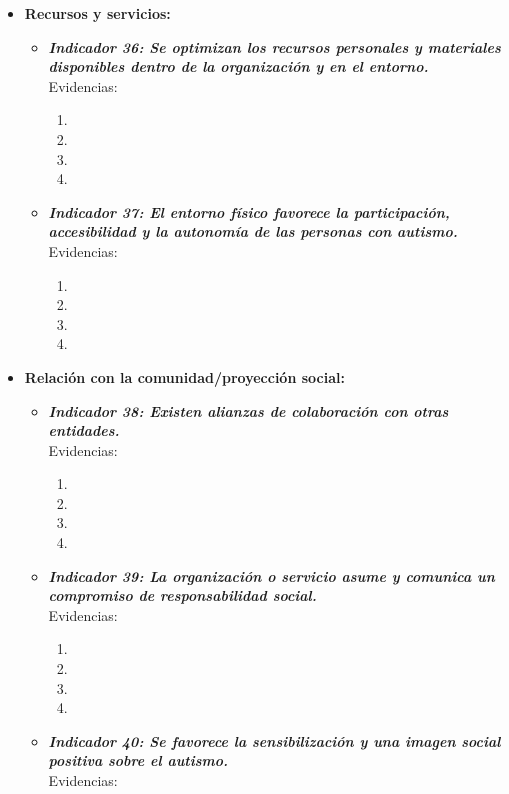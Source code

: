 \begin{itemize}
	\item \textbf{Recursos y servicios:}
	\begin{itemize}
		\item \textbf{\textit{Indicador 36:  Se optimizan los recursos personales y materiales disponibles dentro de la organización y en el entorno.}}\\Evidencias:
		
		\begin{enumerate}
			\item 
			\item 
			\item 
			\item 
		\end{enumerate}
		\item \textbf{\textit{Indicador 37: El entorno físico favorece la participación, accesibilidad y la autonomía de las personas con autismo.}}\\Evidencias:
		
		\begin{enumerate}
			\item 
			\item 
			\item 
			\item 
		\end{enumerate}
	\end{itemize}

	\item \textbf{Relación con la comunidad/proyección social:}
	\begin{itemize}
		\item \textbf{\textit{Indicador 38: Existen alianzas de colaboración con otras entidades.}}\\Evidencias:
			
		\begin{enumerate}
			\item 
			\item 
			\item 
			\item 
		\end{enumerate}
		\item \textbf{\textit{Indicador 39: La organización o servicio asume y comunica un compromiso de responsabilidad social.}}\\Evidencias:
		
		\begin{enumerate}
			\item 
			\item 
			\item 
			\item 
		\end{enumerate}
		\item \textbf{\textit{Indicador 40: Se favorece la sensibilización y una imagen social positiva sobre el autismo.}}\\Evidencias:
		

\end{itemize}
\end{itemize}
